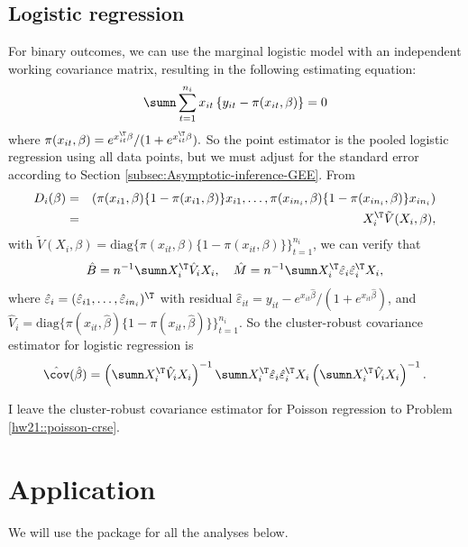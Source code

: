 \subsection{Logistic regression}\label{sec::crse-logit}

For binary outcomes, we can use the marginal logistic model with an independent working covariance matrix,
resulting in the following estimating equation:
\[
\sumn\sum_{t=1}^{n_{i}}x_{it} \left\{ y_{it}-  \pi(x_{it}, \beta)\right\} =0
\]
where $ \pi(x_{it}, \beta) =  e^{x_{it}^{\T}\beta} / (1+e^{x_{it}^{\T}\beta} )  .$
So the point estimator is  the pooled logistic regression using all data
points, but we must adjust for the standard error according to Section
\ref{subsec:Asymptotic-inference-GEE}. From
\begin{eqnarray*}
D_i(\beta) &=&  (
 \pi(x_{i1}, \beta) \{1- \pi(x_{i1}, \beta)\} x_{i1}, \ldots, 
 \pi(x_{in_i}, \beta)\{1- \pi(x_{in_i}, \beta)\} x_{in_i} 
) \\
&=&  X_i^{\T} \tilde{V}(X_i, \beta),
\end{eqnarray*}
with $ \tilde{V}(X_i, \beta) = \text{diag}\{  \pi(x_{it}, \beta) \{1- \pi(x_{it}, \beta)\} \}_{t=1}^{n_i}$,
we can verify that
$$
\hat{B} = n^{-1} \sumn X_i^{\T}  \hat{V}_i X_i,\quad
\hat{M} = n^{-1} \sumn X_i^{\T}  \hat{\varepsilon}_i   \hat{\varepsilon}_i^{\T} X_i,
$$
where $\hat{\varepsilon}_{i} = (\hat{\varepsilon}_{i1}, \ldots, \hat{\varepsilon}_{in_i})^{\T}$ with residual
$\hat{\varepsilon}_{it}=y_{it}-e^{x_{it}\hat{\beta}}/(1+e^{x_{it}\hat{\beta}}) $, and $\hat{V}_i = \text{diag}\{  \pi(x_{it}, \hat{\beta}) \{1- \pi(x_{it}, \hat{\beta})\} \}_{t=1}^{n_i}.$
So the cluster-robust covariance estimator for logistic regression is
\[
\hat{\cov}(\hat{\beta})=\left(\sumn X_{i}^{\T} \hat{V}_i X_{i}\right)^{-1}
\sumn X_{i}^{\T}\hat{\varepsilon}_{i}\hat{\varepsilon}_{i}^{\T}X_{i}
\left(\sumn X_{i}^{\T} \hat{V}_i X_{i}\right)^{-1}.
\]
 

I leave the cluster-robust covariance estimator for Poisson regression to Problem \ref{hw21::poisson-crse}. 



\section{Application}

We will use the  package for all the analyses below. 

 



